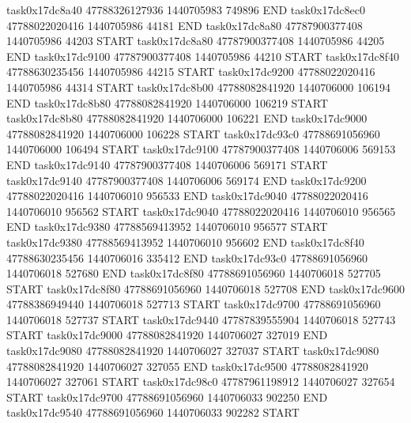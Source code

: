 task0x17dc8a40 47788326127936          1440705983               749896  END
task0x17dc8ec0 47788022020416          1440705986                44181  END
task0x17dc8a80 47787900377408          1440705986                44203  START
task0x17dc8a80 47787900377408          1440705986                44205  END
task0x17dc9100 47787900377408          1440705986                44210  START
task0x17dc8f40 47788630235456          1440705986                44215  START
task0x17dc9200 47788022020416          1440705986                44314  START
task0x17dc8b00 47788082841920          1440706000               106194  END
task0x17dc8b80 47788082841920          1440706000               106219  START
task0x17dc8b80 47788082841920          1440706000               106221  END
task0x17dc9000 47788082841920          1440706000               106228  START
task0x17dc93c0 47788691056960          1440706000               106494  START
task0x17dc9100 47787900377408          1440706006               569153  END
task0x17dc9140 47787900377408          1440706006               569171  START
task0x17dc9140 47787900377408          1440706006               569174  END
task0x17dc9200 47788022020416          1440706010               956533  END
task0x17dc9040 47788022020416          1440706010               956562  START
task0x17dc9040 47788022020416          1440706010               956565  END
task0x17dc9380 47788569413952          1440706010               956577  START
task0x17dc9380 47788569413952          1440706010               956602  END
task0x17dc8f40 47788630235456          1440706016               335412  END
task0x17dc93c0 47788691056960          1440706018               527680  END
task0x17dc8f80 47788691056960          1440706018               527705  START
task0x17dc8f80 47788691056960          1440706018               527708  END
task0x17dc9600 47788386949440          1440706018               527713  START
task0x17dc9700 47788691056960          1440706018               527737  START
task0x17dc9440 47787839555904          1440706018               527743  START
task0x17dc9000 47788082841920          1440706027               327019  END
task0x17dc9080 47788082841920          1440706027               327037  START
task0x17dc9080 47788082841920          1440706027               327055  END
task0x17dc9500 47788082841920          1440706027               327061  START
task0x17dc98c0 47787961198912          1440706027               327654  START
task0x17dc9700 47788691056960          1440706033               902250  END
task0x17dc9540 47788691056960          1440706033               902282  START

